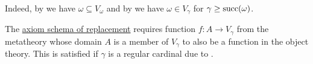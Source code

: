 \begin{remark}
\begin{thmenum}[series=remark:cumulative_hierarchy_model_of_zfcu]
    Indeed, by  we have \( \omega \subseteq V_\omega \) and by  we have \( \omega \in V_\gamma \) for \( \gamma \geq \operatorname{succ}(\omega) \).

     The \hyperref[def:zfc/replacement]{axiom schema of replacement} requires function \( f: A \to V_\gamma \) from the metatheory whose domain \( A \) is a member of \( V_\gamma \) to also be a function in the object theory. This is satisfied if \( \gamma \) is a regular cardinal due to .
  \end{thmenum}
\end{remark}
